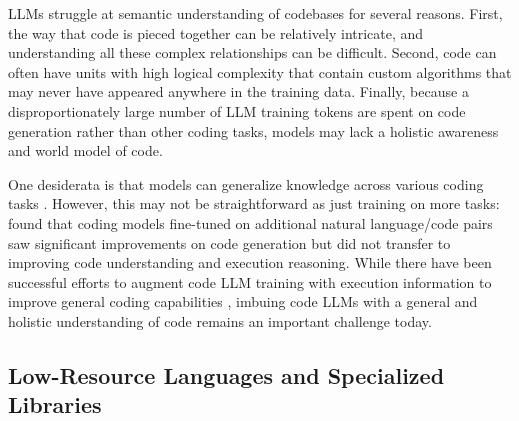 

LLMs struggle at semantic understanding of codebases for several reasons. First, the way that code is pieced together can be relatively intricate, and understanding all these complex relationships can be difficult. Second, code can often have units with high logical complexity that contain custom algorithms that may never have appeared anywhere in the training data. Finally, because a disproportionately large number of LLM training tokens are spent on code generation rather than other coding tasks, models may lack a holistic awareness and world model of code. 

One desiderata is that models can generalize knowledge across various coding tasks \citep{roychoudhury2025will}. However, this may not be straightforward as just training on more tasks: \citet{gu2024cruxeval} found that coding models fine-tuned on additional natural language/code pairs saw significant improvements on code generation but did not transfer to improving code understanding and execution reasoning. While there have been successful efforts to augment code LLM training with execution information to improve general coding capabilities \citep{ni2024next, ding2024traced}, imbuing code LLMs with a general and holistic understanding of code remains an important challenge today.




\subsection{Low-Resource Languages and Specialized Libraries} \label{sec:c-low-resource}

